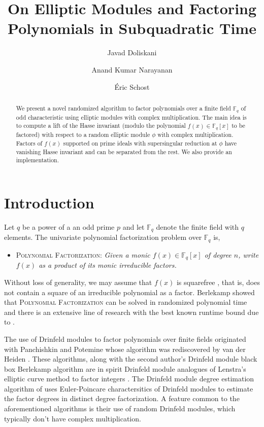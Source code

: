 \documentclass[12pt]{article}
\title{On Elliptic Modules and Factoring Polynomials in Subquadratic Time}
\author[1]{Javad Doliskani}
\author[2]{Anand Kumar Narayanan}
\author[3]{\'Eric Schost}
\affil[1]{\small Institute for Quantum Computing, University of Waterloo}
\affil[2]{\small Computing and Mathematical Sciences, Caltech}
\affil[3]{\small Computer Science Department, University of Waterloo}
\date{}
\theoremstyle{plain}
\theoremstyle{definition}
\def\F{\ensuremath{\mathbb{F}}}
\begin{document}
\maketitle

\begin{abstract}
	We present a novel randomized algorithm to factor polynomials over a finite field $\F_q$ of odd 
	characteristic using elliptic modules with complex multiplication. The main idea is to compute a
	lift of the Hasse invariant (modulo the polynomial $f(x) \in \F_q[x]$ to be factored) with 
	respect to a random elliptic module $\phi$ with complex multiplication. Factors of $f(x)$  
	supported on prime ideals with supersingular reduction at $\phi$ have vanishing Hasse invariant
	and can be separated from the rest. We also provide an implementation.
\end{abstract}



\section{Introduction}

Let $q$ be a power of a an odd prime $p$ and let $\F_q$ denote the finite field with $q$ elements. 
The univariate polynomial factorization problem over $\F_q$ is,
\begin{itemize}
	\item \textsc{Polynomial Factorization:} \textit{Given a monic $f(x) \in \mathbb{F}_q[x]$ of 
		degree $n$, write $f(x)$ as a product of its monic irreducible factors.}
\end{itemize}
Without loss of generality, we may assume that $f(x)$ is squarefree \cite{knu,yun}, that is, does 
not contain a square of an irreducible polynomial as a factor. Berlekamp showed that 
\textsc{Polynomial Factorization} can be solved in randomized polynomial time \cite{ber} and there 
is an extensive line of research \cite{cz,gs,ks,ku} with the best known runtime bound due to 
\cite{ku}.

The use of Drinfeld modules to factor polynomials over finite fields originated with Panchishkin 
and Potemine \cite{pp} whose algorithm was rediscovered by van der Heiden \cite{vdH}. These 
algorithms, along with the second author's Drinfeld module black box Berlekamp algorithm \cite{nar} 
are in spirit Drinfeld module analogues of Lenstra's elliptic curve method to factor integers 
\cite{len}. The Drinfeld module degree estimation algorithm of \cite{nar} uses Euler-Poincare 
charactersitics of Drinfeld modules to estimate the factor degrees in distinct degree 
factorization. A feature common to the aforementioned algorithms is their use of random Drinfeld 
modules, which typically don't have complex multiplication.
\end{document}
